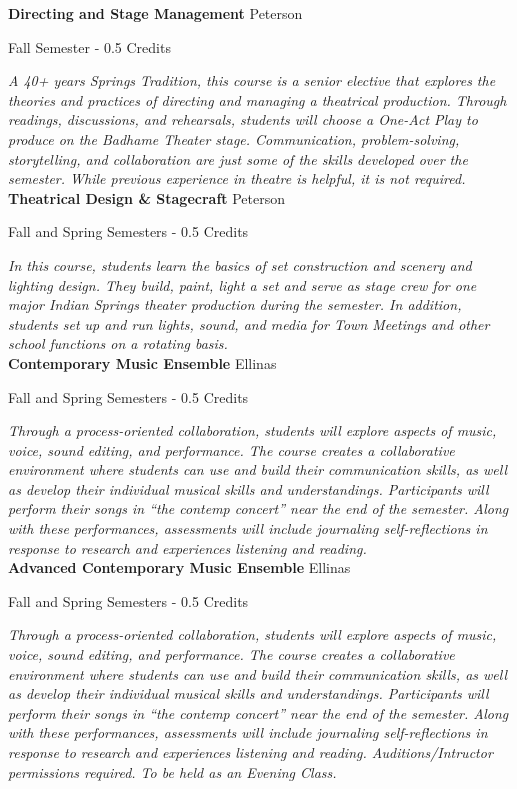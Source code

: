 \noindent\textbf{Directing and Stage Management} \hfill Peterson

\noindent Fall Semester - 0.5 Credits

\vspace{1mm}\emph{A 40+ years Springs Tradition, this course is a senior elective that explores the theories and practices of directing and managing a theatrical production. Through readings, discussions, and rehearsals, students will choose a One-Act Play to produce on the Badhame Theater stage. Communication, problem-solving, storytelling, and collaboration are just some of the skills developed over the semester. While previous experience in theatre is helpful, it is not required.}\\

\noindent\textbf{Theatrical Design \& Stagecraft} \hfill Peterson

\noindent Fall and Spring Semesters - 0.5 Credits

\vspace{1mm}\emph{In this course, students learn the basics of set construction and scenery and lighting design. They build, paint, light a set and serve as stage crew for one major Indian Springs theater production during the semester. In addition, students set up and run lights, sound, and media for Town Meetings and other school functions on a rotating basis.}\\

\noindent\textbf{Contemporary Music Ensemble} \hfill Ellinas

\noindent Fall and Spring Semesters - 0.5 Credits

\vspace{1mm}\emph{Through a process-oriented collaboration, students will explore aspects of music, voice, sound editing, and performance. The course creates a collaborative environment where students can use and build their communication skills, as well as develop their individual musical skills and understandings. Participants will perform their songs in “the contemp concert” near the end of the semester. Along with these performances, assessments will include journaling self-reflections in response to research and experiences listening and reading.}\\

\noindent\textbf{Advanced Contemporary Music Ensemble} \hfill Ellinas

\noindent Fall and Spring Semesters - 0.5 Credits

\vspace{1mm}\emph{Through a process-oriented collaboration, students will explore aspects of music, voice, sound editing, and performance. The course creates a collaborative environment where students can use and build their communication skills, as well as develop their individual musical skills and understandings. Participants will perform their songs in “the contemp concert” near the end of the semester. Along with these performances, assessments will include journaling self-reflections in response to research and experiences listening and reading.  Auditions/Intructor permissions required.  To be held as an Evening Class.}\\

